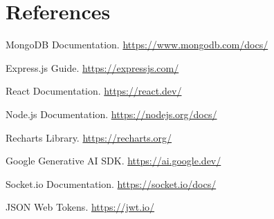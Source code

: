 \documentclass[12pt,a4paper]{article}
\begin{document}
\section*{References}
\begin{enumerate}[leftmargin=*, label={[\arabic*]}, noitemsep]
  \item MongoDB Documentation. \url{https://www.mongodb.com/docs/}
  \item Express.js Guide. \url{https://expressjs.com/}
  \item React Documentation. \url{https://react.dev/}
  \item Node.js Documentation. \url{https://nodejs.org/docs/}
  \item Recharts Library. \url{https://recharts.org/}
  \item Google Generative AI SDK. \url{https://ai.google.dev/}
  \item Socket.io Documentation. \url{https://socket.io/docs/}
  \item JSON Web Tokens. \url{https://jwt.io/}
\end{enumerate}
\end{document}
